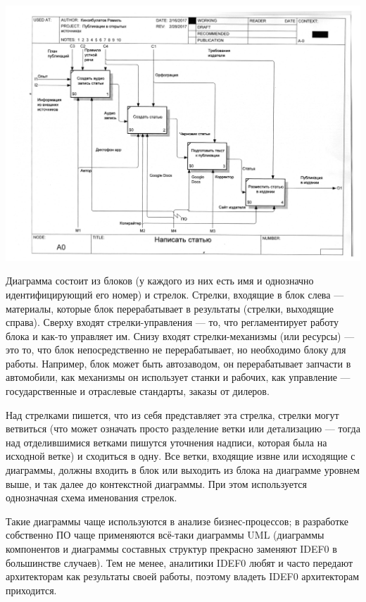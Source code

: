 \documentclass{../mcstext}
\begin{document}
\begin{center}
    \includegraphics[width=\textwidth]{idef0.png}
\end{center}

Диаграмма состоит из блоков (у каждого из них есть имя и однозначно идентифицирующий его номер) и стрелок. Стрелки, входящие в блок слева --- материалы, которые блок перерабатывает в результаты (стрелки, выходящие справа). Сверху входят стрелки-управления --- то, что регламентирует работу блока и как-то управляет им. Снизу входят стрелки-механизмы (или ресурсы) --- это то, что блок непосредственно не перерабатывает, но необходимо блоку для работы. Например, блок может быть автозаводом, он перерабатывает запчасти в автомобили, как механизмы он использует станки и рабочих, как управление --- государственные и отраслевые стандарты, заказы от дилеров.

Над стрелками пишется, что из себя представляет эта стрелка, стрелки могут ветвиться (что может означать просто разделение ветки или детализацию --- тогда над отделившимися ветками пишутся уточнения надписи, которая была на исходной ветке) и сходиться в одну. Все ветки, входящие извне или исходящие с диаграммы, должны входить в блок или выходить из блока на диаграмме уровнем выше, и так далее до контекстной диаграммы. При этом используется однозначная схема именования стрелок.

Такие диаграммы чаще используются в анализе бизнес-процессов; в разработке собственно ПО чаще применяются всё-таки диаграммы UML (диаграммы компонентов и диаграммы составных структур прекрасно заменяют IDEF0 в большинстве случаев). Тем не менее, аналитики IDEF0 любят и часто передают архитекторам как результаты своей работы, поэтому владеть IDEF0 архитекторам приходится.
\end{document}
